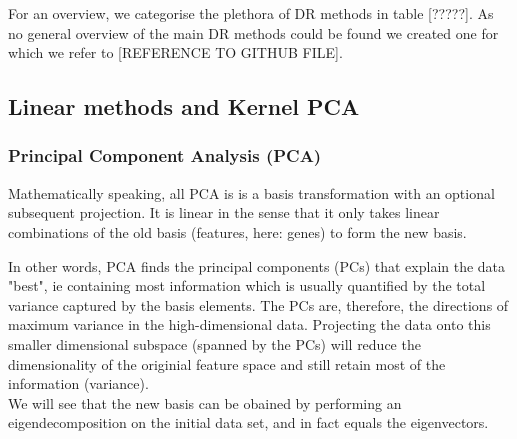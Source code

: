 \documentclass[journal, a4paper]{IEEEtran}
\begin{document}
For an overview, we categorise the plethora of DR methods in table [?????]. As no general overview of the main DR methods could be found we created one for which we refer to [REFERENCE TO GITHUB FILE].






\subsection{Linear methods and Kernel PCA}

\subsubsection{Principal Component Analysis (PCA)}


Mathematically speaking, all PCA is is a basis transformation with an optional subsequent projection. It is linear in the sense that it only takes linear combinations of the old basis (features, here: genes) to form the new basis. 

In other words, PCA finds the principal components (PCs) that explain the data "best", ie containing most information which is usually quantified by the total variance captured by the basis elements. The PCs are, therefore, the directions of maximum variance in the high-dimensional data. Projecting the data onto this smaller dimensional subspace (spanned by the PCs) will reduce the dimensionality of the originial feature space and still retain most of the information (variance). \\
We will see that the new basis can be obained by performing an eigendecomposition on the initial data set, and in fact equals the eigenvectors.
\end{document}
